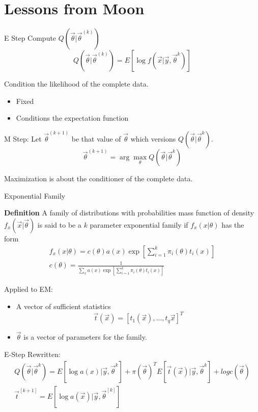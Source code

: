 \documentclass[11pt]{article}
\begin{document}
\section{Lessons from Moon}

E Step
Compute $Q( \vec{\theta} | \vec{\theta} ^{(k)})$
\begin{equation}
Q(\vec{\theta} | \vec{\theta}^{(k)}) = E [ \log f(\vec{x} | \vec{y} , \vec{\theta}^k )]
\end{equation}


Condition the likelihood of the complete data.

\begin{itemize}
\item Fixed
\item Conditions the expectation function
\end{itemize}

M Step:  Let $\vec{\theta}^{(k+1)}$ be that value of $\vec{\theta}$ which versions $Q( \vec{\theta} | \vec{\theta} ^k)$.
\[
\vec{\theta} ^{(k+1)} = \arg \max _{\theta} Q(\vec{\theta} | \vec{\theta}^k)
\]

Maximization is about the conditioner of the complete data.


Exponential Family

\textbf{Definition} A family of distributions with probabilities mass function of density $f_x ( \vec{x} | \vec{\theta})$ is said to be a $k$ parameter exponential family if $f_x (x | \theta )$ has the form 
\begin{eqnarray*}
f_x (x | \theta ) = c ( \theta) a (x) \exp [ \sum_{i=1}^k \pi _i (\theta) t_i (x)] \\
c (\theta ) = \frac{1}{\sum_x a(x) \exp [\sum_{i=1}^k \pi _i (\theta) t_i (x)   ]} 
\end{eqnarray*}


Applied to EM:
\begin{itemize}
\item A vector of sufficient statistics
\[\vec{t}(\vec{x}) = [t_1(\vec{x}), ...,t_q \vec{x} ] ^T \]
\item $\vec{\theta}$ is a vector of parameters for the family.
\end{itemize}

E-Step Rewritten:
\begin{eqnarray}
Q(\vec{\theta} | \vec{\theta}^k)  = E[ \log a(x) | \vec{y} , \vec{\theta}^k] + \pi (\vec{\theta})^T E[ \vec{t}(\vec{x}) | \vec{y}, \vec{\theta}^k] + log c(\vec{\theta}) \\
\vec{t}^{[k+1]} = E [ \log a(\vec{x}) | \vec{y} , \vec{\theta}^{[k]} ]
\end{eqnarray}
\end{document}
